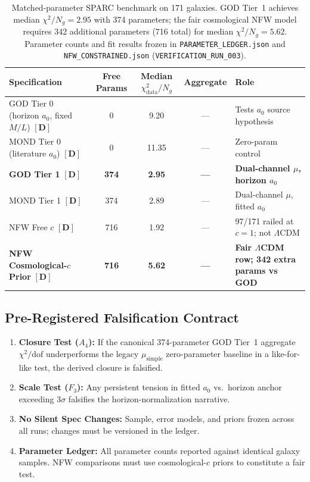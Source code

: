 \documentclass[aps,prd,preprint,superscriptaddress,nofootinbib,amsmath,amssymb,floatfix]{revtex4-2}
\begin{document}
\begin{table}[t]
\centering
\footnotesize
\begin{tabularx}{\textwidth}{@{}l c c c X@{}}
\toprule
\textbf{Specification} & \textbf{Free Params} & \textbf{Median $\chi^2_{\text{data}}/N_g$} & \textbf{Aggregate} & \textbf{Role} \\
\midrule
GOD Tier 0 (horizon $a_0$, fixed $M/L$) $\mathbf{[D]}$ & 0 & 9.20 & --- & Tests $a_0$ source hypothesis \\
MOND Tier 0 (literature $a_0$) $\mathbf{[D]}$ & 0 & 11.35 & --- & Zero-param control \\
\textbf{GOD Tier 1} $\mathbf{[D]}$ & \textbf{374} & \textbf{2.95} & \textbf{---} & \textbf{Dual-channel $\mu$, horizon $a_0$} \\
MOND Tier 1 $\mathbf{[D]}$ & 374 & 2.89 & --- & Dual-channel $\mu$, fitted $a_0$ \\
NFW Free $c$ $\mathbf{[D]}$ & 716 & 1.92 & --- & 97/171 railed at $c=1$; not $\Lambda$CDM \\
\textbf{NFW Cosmological-$c$ Prior} $\mathbf{[D]}$ & \textbf{716} & \textbf{5.62} & \textbf{---} & \textbf{Fair $\Lambda$CDM row; 342 extra params vs GOD} \\
\bottomrule
\end{tabularx}
\caption{Matched-parameter SPARC benchmark on 171 galaxies. GOD Tier~1 achieves median $\chi^2/N_g = 2.95$ with 374 parameters; the fair cosmological NFW model requires 342 additional parameters (716 total) for median $\chi^2/N_g = 5.62$. Parameter counts and fit results frozen in \texttt{PARAMETER\_LEDGER.json} and \texttt{NFW\_CONSTRAINED.json} (\texttt{VERIFICATION\_RUN\_003}).}
\label{tab:sparc_results}
\end{table}

\subsection{Pre-Registered Falsification Contract}

\begin{tcolorbox}[colback=boxbg,colframe=primary,title=\textbf{Pre-Registered Interpretation Contract}]
\begin{enumerate}
    \item \textbf{Closure Test ($A_4$):} If the canonical 374-parameter GOD Tier~1 aggregate $\chi^2/\text{dof}$ underperforms the legacy $\mu_{\text{simple}}$ zero-parameter baseline in a like-for-like test, the derived closure is falsified.
    \item \textbf{Scale Test ($F_3$):} Any persistent tension in fitted $a_0$ vs.\ horizon anchor exceeding $3\sigma$ falsifies the horizon-normalization narrative.
    \item \textbf{No Silent Spec Changes:} Sample, error models, and priors frozen across all runs; changes must be versioned in the ledger.
    \item \textbf{Parameter Ledger:} All parameter counts reported against identical galaxy samples. NFW comparisons must use cosmological-$c$ priors to constitute a fair test.
\end{enumerate}
\end{tcolorbox}
\end{document}
